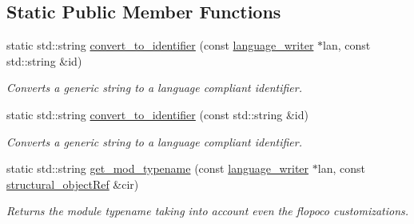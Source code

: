 \subsection*{Static Public Member Functions}
\begin{DoxyCompactItemize}
\item 
static std\+::string \hyperlink{classHDL__manager_a4e2cbf9a5efaf0260a29e64ec3906500}{convert\+\_\+to\+\_\+identifier} (const \hyperlink{classlanguage__writer}{language\+\_\+writer} $\ast$lan, const std\+::string \&id)
\begin{DoxyCompactList}\small\item\em Converts a generic string to a language compliant identifier. \end{DoxyCompactList}\item 
static std\+::string \hyperlink{classHDL__manager_a17d23ec3794851853505d45852d9af72}{convert\+\_\+to\+\_\+identifier} (const std\+::string \&id)
\begin{DoxyCompactList}\small\item\em Converts a generic string to a language compliant identifier. \end{DoxyCompactList}\item 
static std\+::string \hyperlink{classHDL__manager_a94b432648de92166282cf3dc67524cec}{get\+\_\+mod\+\_\+typename} (const \hyperlink{classlanguage__writer}{language\+\_\+writer} $\ast$lan, const \hyperlink{structural__objects_8hpp_a8ea5f8cc50ab8f4c31e2751074ff60b2}{structural\+\_\+object\+Ref} \&cir)
\begin{DoxyCompactList}\small\item\em Returns the module typename taking into account even the flopoco customizations. \end{DoxyCompactList}\end{DoxyCompactItemize}
